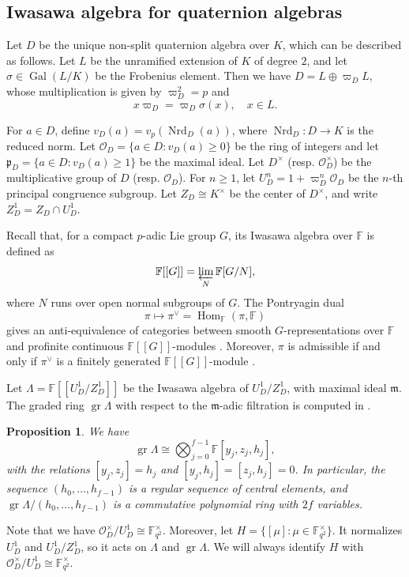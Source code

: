 \documentclass{article}
\newtheorem{proposition}[definition]{Proposition}
\numberwithin{equation}{section}
\DeclareMathOperator{\Hom}{Hom}
\DeclareMathOperator{\Gal}{Gal}
\DeclareMathOperator{\gr}{gr}
\DeclareMathOperator{\Nrd}{Nrd}
\newcommand{\fm}{\mathfrak{m}}
\newcommand{\fp}{\mathfrak{p}}
\newcommand{\bF}{\mathbb{F}}
\newcommand{\cO}{\mathcal{O}}
\begin{document}
\subsection{Iwasawa algebra for quaternion algebras}
Let $D$ be the unique non-split quaternion algebra over $K$, which can be described as follows. Let $L$ be the unramified extension of $K$ of degree $2$, 
and let $\sigma\in\Gal(L/K)$ be the Frobenius element. Then we have $D=L\oplus \varpi_D L$, whose multiplication is given by $\varpi_D^2=p$ and 
\begin{equation}
    x\varpi_D=\varpi_D\sigma(x),\quad x\in L.
\end{equation}

For $a\in D$, define $v_D(a)=v_p(\Nrd_D(a))$, where $\Nrd_D:D\to K$ is the reduced norm. 
Let $\cO_D=\{a\in D:v_D(a)\geq 0\}$ be the ring of integers and let $\fp_D=\{a\in D:v_D(a)\geq 1\}$ be the maximal ideal. 
Let $D^\times$ (resp. $\cO_D^\times$) be the multiplicative group of $D$ (resp. $\cO_D$). 
For $n\geq 1$, let $U_D^n=1+\varpi_D^n\cO_D$ be the $n$-th principal congruence subgroup. 
Let $Z_D\cong K^\times$ be the center of $D^\times$, and write $Z_D^1=Z_D\cap U_D^1$. 

Recall that, for a compact $p$-adic Lie group $G$, its Iwasawa algebra over $\bF$ is defined as 
$$\bF[[G]]=\varprojlim_{N}\bF[G/N],$$
where $N$ runs over open normal subgroups of $G$. The Pontryagin dual 
$$\pi\mapsto \pi^\vee=\Hom_{\bF}(\pi,\bF)$$ 
gives an anti-equivalence of categories between smooth $G$-representations over $\bF$ and profinite continuous $\bF[[G]]$-modules \cite[Lemma~2.2.7]{Eme10}. 
Moreover, $\pi$ is admissible if and only if $\pi^\vee$ is a finitely generated $\bF[[G]]$-module \cite[Lemma~2.2.11]{Eme10}. 


Let $\Lambda=\bF[[U_D^1/Z_D^1]]$ be the Iwasawa algebra of $U_D^1/Z_D^1$, with maximal ideal $\fm$. 
The graded ring $\gr \Lambda$ with respect to the $\fm$-adic filtration is computed in \cite[\S~2.2, 2.3]{HW24a}. 

\begin{proposition}
    We have 
    $$\gr \Lambda\cong\bigotimes_{j=0}^{f-1}\bF[y_j,z_j,h_j],$$
    with the relations $[y_j,z_j]=h_j$ and $[y_j,h_j]=[z_j,h_j]=0$. 
    In particular, the sequence $(h_0,\ldots,h_{f-1})$ is a regular sequence of central elements, and 
    $\gr \Lambda/(h_0,\ldots,h_{f-1})$ is a commutative polynomial ring with $2f$ variables. 
\end{proposition}

Note that we have $\cO_D^\times/U_D^1\cong \bF_{q^2}^\times$. 
Moreover, let $H=\{[\mu]:\mu\in \bF_{q^2}^\times\}$. It normalizes $U_D^1$ and $U_D^1/Z_D^1$, so it acts on $\Lambda$ and $\gr \Lambda$. 
We will always identify $H$ with $\cO_D^\times/U_D^1\cong \bF_{q^2}^\times$.
\end{document}
